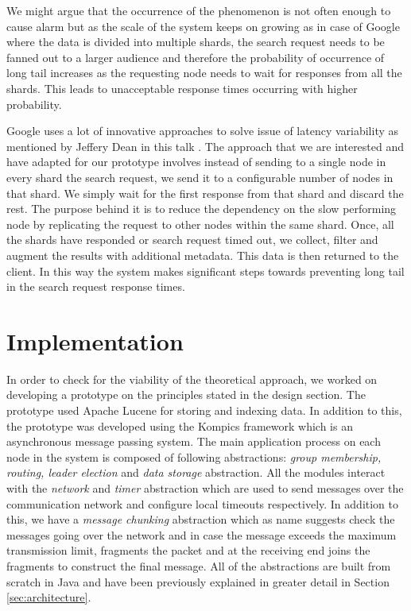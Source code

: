 \documentclass[12pt,a4paper,twoside,openright]{book}
\begin{document}
\par We might argue that the occurrence of the phenomenon is not often enough to cause alarm but as the scale of the system keeps on growing as in case of Google where the data is divided into multiple shards, the search request needs to be fanned out to a larger audience and therefore the probability of occurrence of long tail increases as the requesting node needs to wait for responses from all the shards. This leads to unacceptable response times occurring with higher probability. 

\par Google uses a lot of innovative approaches to solve issue of latency variability as mentioned by Jeffery Dean in this talk \cite{jeffDean}. The approach that we are interested and have adapted for our prototype involves instead of sending to a single node in every shard the search request, we send it to a configurable number of nodes in that shard. We simply wait for the first response from that shard and discard the rest. The purpose behind it is to reduce the dependency on the slow performing node by replicating the request to other nodes within the same shard. Once, all the shards have responded or search request timed out, we collect, filter and augment the results with additional metadata. This data is then returned to the client. In this way the system makes significant steps towards preventing long tail in the search request response times.


\chapter{Implementation}
\label{chap:impl}

In order to check for the viability of the theoretical approach, we worked on developing a prototype on the principles stated in the design section. The prototype used Apache Lucene for storing and indexing data. In addition to this, the prototype was developed using the Kompics framework which is an asynchronous message passing system. The main application process on each node in the system is composed of following abstractions: \textit {group membership, routing, leader election} and \textit{data storage} abstraction. All the modules interact with the \textit{network} and \textit{timer} abstraction which are used to send messages over the communication network and configure local timeouts respectively. In addition to this, we have a \textit{message chunking} abstraction which as name suggests check the messages going over the network and in case the message exceeds the maximum transmission limit, fragments the packet and at the receiving end joins the fragments to construct the final message. All of the abstractions are built from scratch in Java and have been previously explained in greater detail in Section \ref{sec:architecture}.
\end{document}
